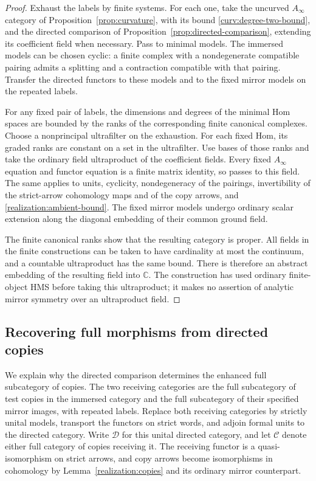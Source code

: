 \documentclass[11pt]{article}
\numberwithin{equation}{section}
\theoremstyle{definition}
\theoremstyle{remark}
\begin{document}
\begin{proof}
Exhaust the labels by finite systems.  For each one, take the uncurved
$A_\infty$ category of Proposition~\ref{prop:curvature}, with its bound
\eqref{curv:degree-two-bound}, and the
directed comparison of Proposition~\ref{prop:directed-comparison},
extending its coefficient field when necessary.  Pass to minimal
models.  The immersed models can be chosen cyclic: a finite complex
with a nondegenerate compatible pairing admits a splitting and a
contraction compatible with that pairing.  Transfer the directed
functors to these models and to the fixed mirror models on the repeated
labels.

For any fixed pair of labels, the dimensions and degrees of the minimal
Hom spaces are bounded by the ranks of the corresponding finite
canonical complexes.  Choose a nonprincipal ultrafilter on the
exhaustion.  For each fixed Hom, its graded ranks are constant on a set
in the ultrafilter.  Use bases of those ranks and take the ordinary
field ultraproduct of the coefficient fields.  Every fixed
$A_\infty$ equation and functor equation is a finite matrix identity,
so passes to this field.  The same applies to units, cyclicity,
nondegeneracy of the pairings, invertibility of the strict-arrow
cohomology maps and of the copy arrows, and
\eqref{realization:ambient-bound}.
The fixed mirror models undergo ordinary scalar extension along the
diagonal embedding of their common ground field.

The finite canonical ranks show that the resulting category is proper.
All fields in the finite constructions can be taken to have cardinality
at most the continuum, and a countable ultraproduct has the same bound.
There is therefore an abstract embedding of the resulting field into
$\mathbb C$.  The construction has used ordinary finite-object HMS before
taking this ultraproduct; it makes no assertion of analytic mirror
symmetry over an ultraproduct field.
\end{proof}

\subsection{Recovering full morphisms from directed copies}

We explain why the directed comparison determines the enhanced full
subcategory of copies.  The two receiving categories are the full
subcategory of test copies in the immersed category and the full
subcategory of their specified mirror images, with repeated labels.
Replace both receiving categories by
strictly unital models, transport the functors on strict words, and
adjoin formal units to the directed category.  Write $\mathcal D$ for
this unital directed category, and let $\mathcal C$ denote either full
category of copies receiving it.  The receiving functor is a
quasi-isomorphism on strict arrows, and copy arrows become isomorphisms
in cohomology by Lemma~\ref{realization:copies} and its ordinary mirror
counterpart.
\end{document}
